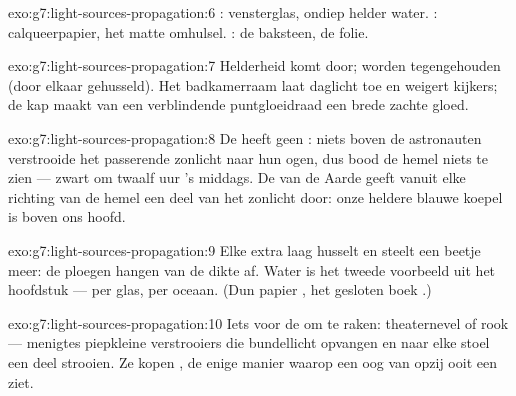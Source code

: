 \begin{solution}{exo:g7:light-sources-propagation:6}
: vensterglas, ondiep helder water.
: calqueerpapier, het matte omhulsel.
: de baksteen, de folie.
\end{solution}

\begin{solution}{exo:g7:light-sources-propagation:7}
Helderheid komt door;  worden tegengehouden (door elkaar
gehusseld). Het badkamerraam laat daglicht toe en weigert kijkers; de
kap maakt van een verblindende puntgloeidraad een brede zachte gloed.
\end{solution}

\begin{solution}{exo:g7:light-sources-propagation:8}
De  heeft geen : niets boven de astronauten verstrooide het
passerende zonlicht naar hun ogen, dus bood de hemel niets te zien ---
zwart om twaalf uur 's middags. De  van de Aarde geeft vanuit elke
richting van de hemel een deel van het zonlicht door: onze heldere
blauwe koepel is  boven ons hoofd.
\end{solution}

\begin{solution}{exo:g7:light-sources-propagation:9}
Elke extra laag husselt en steelt een beetje meer: de ploegen hangen
van de dikte af. Water is het tweede voorbeeld uit het hoofdstuk ---
 per glas,  per oceaan. (Dun papier
, het gesloten boek .)
\end{solution}

\begin{solution}{exo:g7:light-sources-propagation:10}
Iets voor de  om te raken: theaternevel of rook --- menigtes
piepkleine verstrooiers die bundellicht opvangen en naar elke stoel
een deel strooien. Ze kopen , de enige manier waarop een
oog van opzij ooit een  ziet.
\end{solution}

